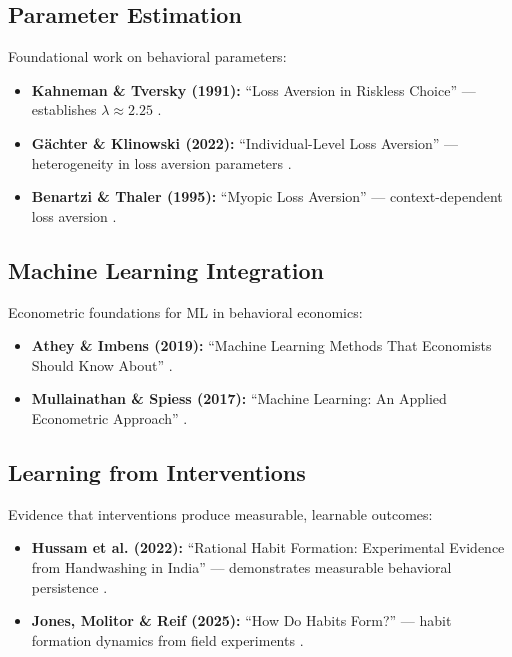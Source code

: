 \subsection{Parameter Estimation}

Foundational work on behavioral parameters:
\begin{itemize}[nosep]
\item \textbf{Kahneman \& Tversky (1991):} ``Loss Aversion in Riskless Choice''
      --- establishes $\lambda \approx 2.25$ \citep{kahneman1991loss}.
\item \textbf{Gächter \& Klinowski (2022):} ``Individual-Level Loss Aversion''
      --- heterogeneity in loss aversion parameters \citep{gaechter2022lossaversion}.
\item \textbf{Benartzi \& Thaler (1995):} ``Myopic Loss Aversion'' ---
      context-dependent loss aversion \citep{benartzi1995myopic}.
\end{itemize}

\subsection{Machine Learning Integration}

Econometric foundations for ML in behavioral economics:
\begin{itemize}[nosep]
\item \textbf{Athey \& Imbens (2019):} ``Machine Learning Methods That
      Economists Should Know About'' \citep{athey2019machine}.
\item \textbf{Mullainathan \& Spiess (2017):} ``Machine Learning: An Applied
      Econometric Approach'' \citep{mullainathan2017machine}.
\end{itemize}

\subsection{Learning from Interventions}

Evidence that interventions produce measurable, learnable outcomes:
\begin{itemize}[nosep]
\item \textbf{Hussam et al. (2022):} ``Rational Habit Formation: Experimental
      Evidence from Handwashing in India'' --- demonstrates measurable
      behavioral persistence \citep{hussam2022rational}.
\item \textbf{Jones, Molitor \& Reif (2025):} ``How Do Habits Form?'' ---
      habit formation dynamics from field experiments \citep{jones2025habits}.
\end{itemize}


